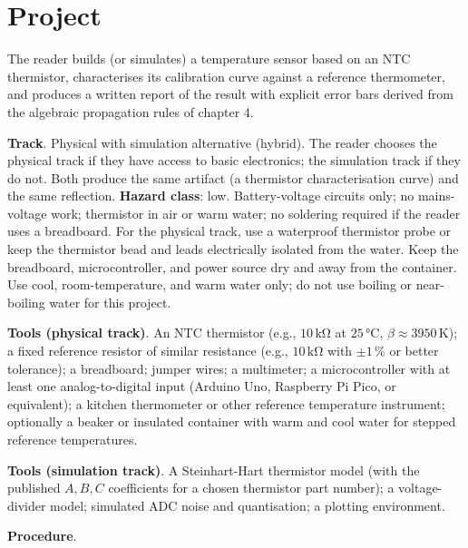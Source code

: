 \section{Project}

\begin{project}
The reader builds (or simulates) a temperature sensor based on an
NTC thermistor, characterises its calibration curve against a
reference thermometer, and produces a written report of the result
with explicit error bars derived from the algebraic propagation
rules of chapter 4.

\textbf{Track}. Physical with simulation alternative (hybrid). The
reader chooses the physical track if they have access to basic
electronics; the simulation track if they do not. Both produce the
same artifact (a thermistor characterisation curve) and the same
reflection.
\textbf{Hazard class}: low. Battery-voltage circuits only; no
mains-voltage work; thermistor in air or warm water; no soldering
required if the reader uses a breadboard. For the physical track,
use a waterproof thermistor probe or keep the thermistor bead and
leads electrically isolated from the water. Keep the breadboard,
microcontroller, and power source dry and away from the container.
Use cool, room-temperature, and warm water only; do not use boiling
or near-boiling water for this project.

\textbf{Tools (physical track)}. An NTC thermistor (e.g.,
$10 \,\si{\kilo\ohm}$ at $25 \,\si{\degreeCelsius}$,
$\beta \approx 3950 \,\si{\kelvin}$); a fixed reference resistor of
similar resistance (e.g., $10 \,\si{\kilo\ohm}$ with $\pm 1\,\%$ or
better tolerance); a breadboard; jumper wires; a multimeter; a
microcontroller with at least one analog-to-digital input (Arduino
Uno, Raspberry Pi Pico, or equivalent); a kitchen thermometer or
other reference temperature instrument; optionally a beaker or
insulated container with warm and cool water for stepped reference
temperatures.

\textbf{Tools (simulation track)}. A Steinhart-Hart thermistor
model (with the published $A, B, C$ coefficients for a chosen
thermistor part number); a voltage-divider model; simulated ADC
noise and quantisation; a plotting environment.

\textbf{Procedure}.


\end{project}
